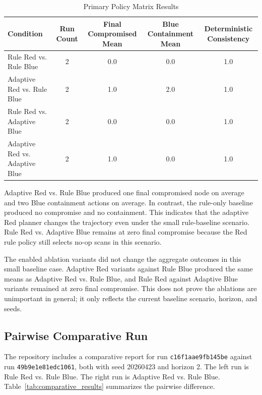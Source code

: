 \documentclass[conference]{IEEEtran}
\begin{document}
\begin{table}[htbp]
\centering
\caption{Primary Policy Matrix Results}
\label{tab:policy_results_comparison}
\begin{tabular}{|l|c|c|c|c|}
\hline
\textbf{Condition} & \textbf{Run Count} & \textbf{Final Compromised Mean} & \textbf{Blue Containment Mean} & \textbf{Deterministic Consistency} \\
\hline
Rule Red vs. Rule Blue & 2 & 0.0 & 0.0 & 1.0 \\
\hline
Adaptive Red vs. Rule Blue & 2 & 1.0 & 2.0 & 1.0 \\
\hline
Rule Red vs. Adaptive Blue & 2 & 0.0 & 0.0 & 1.0 \\
\hline
Adaptive Red vs. Adaptive Blue & 2 & 1.0 & 0.0 & 1.0 \\
\hline
\end{tabular}
\end{table}

Adaptive Red vs. Rule Blue produced one final compromised node on average and two Blue containment actions on average. In contrast, the rule-only baseline produced no compromise and no containment. This indicates that the adaptive Red planner changes the trajectory even under the small rule-baseline scenario. Rule Red vs. Adaptive Blue remains at zero final compromise because the Red rule policy still selects no-op scans in this scenario.

The enabled ablation variants did not change the aggregate outcomes in this small baseline case. Adaptive Red variants against Rule Blue produced the same means as Adaptive Red vs. Rule Blue, and Rule Red against Adaptive Blue variants remained at zero final compromise. This does not prove the ablations are unimportant in general; it only reflects the current baseline scenario, horizon, and seeds.

\subsection{Pairwise Comparative Run}
The repository includes a comparative report for run \texttt{c16f1aae9fb145be} against run \texttt{49b9e1e81edc1061}, both with seed 20260423 and horizon 2. The left run is Rule Red vs. Rule Blue. The right run is Adaptive Red vs. Rule Blue. Table~\ref{tab:comparative_results} summarizes the pairwise difference.
\end{document}
